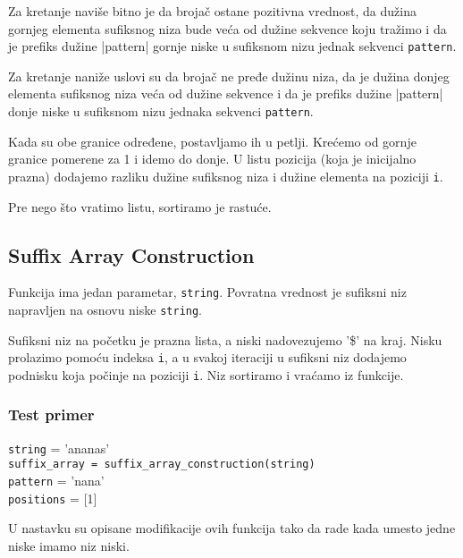 Za kretanje naviše bitno je da brojač ostane pozitivna vrednost, da dužina gornjeg elementa sufiksnog niza bude veća od dužine sekvence koju tražimo i da je prefiks dužine |pattern| gornje niske u sufiksnom nizu jednak sekvenci \texttt{pattern}. 

Za kretanje naniže uslovi su da brojač ne pređe dužinu niza, da je dužina donjeg elementa sufiksnog niza veća od dužine sekvence i da je prefiks dužine |pattern| donje niske u sufiksnom nizu jednaka sekvenci \texttt{pattern}.

Kada su obe granice određene, postavljamo ih u petlji. Krećemo od gornje granice pomerene za 1 i idemo do donje. U listu pozicija (koja je inicijalno prazna) dodajemo razliku dužine sufiksnog niza i dužine elementa na poziciji \texttt{i}.

Pre nego što vratimo listu, sortiramo je rastuće.




\subsection{Suffix Array Construction}
\label{suffixArrayConstruction}

Funkcija ima jedan parametar, \texttt{string}. Povratna vrednost je sufiksni niz napravljen na osnovu niske \texttt{string}.

Sufiksni niz na početku je prazna lista, a niski nadovezujemo '\$' na kraj. Nisku prolazimo pomoću indeksa \texttt{i}, a u svakoj iteraciji u sufiksni niz dodajemo podnisku koja počinje na poziciji \texttt{i}. Niz sortiramo i vraćamo iz funkcije.




\subsubsection{Test primer}

\texttt{string} = 'ananas'
\\\texttt{suffix\_array = suffix\_array\_construction(string)} 
\\\texttt{pattern} = 'nana'
\\\texttt{positions} = [1]


U nastavku su opisane modifikacije ovih funkcija tako da rade kada umesto jedne niske imamo niz niski.

